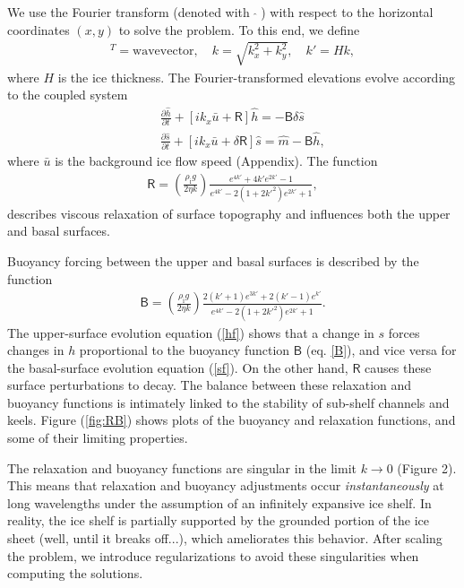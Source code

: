 \documentclass[paper=a4, fontsize=11pt]{article} %
\begin{document}
We use the Fourier transform (denoted with $\;\widehat{}\;$) with respect to the horizontal coordinates $(x,y)$
to solve the problem. To this end, we define
\begin{align*}
[k_x,k_y]^T = \text{wavevector},\quad
k = \sqrt{k_x^2 + k_y^2},\quad
k' = Hk,
\end{align*}
where $H$ is the ice thickness.
The Fourier-transformed elevations evolve according to
the coupled system
\begin{eqnarray}
&&\frac{\partial \widehat{h}}{\partial t}+ \left[ik_x \bar{u}  + \mathsf{R}\right]\widehat{h} = -\mathsf{B}\delta\widehat{s}\label{hf}\\
&&\frac{\partial \widehat{s}}{\partial t}+ [ik_x \bar{u} + \delta\mathsf{R}]\widehat{s} = \widehat{m} - \mathsf{B} \widehat{h}, \label{sf}
\end{eqnarray}
where $\bar{u}$ is the background ice flow speed (Appendix). The function
\begin{eqnarray}
\mathsf{R} = \left(\frac{\rho_\mathrm{i} g}{2\eta k}\right) \frac{e^{4{k'}} +4{k'} e^{2{k'}} -1 }{e^{4{k'}} -2(1+2{k'}^2)e^{2{k'}} +1}, \label{Rf}
\end{eqnarray}
describes viscous relaxation of surface topography and influences both the upper and basal surfaces.

Buoyancy forcing between the upper and basal surfaces is described by the function
\begin{eqnarray}
\mathsf{B} = \left(\frac{\rho_\mathrm{i} g}{2\eta k}\right) \frac{ 2({k'}+1)e^{3{k'}}+2({k'}-1)e^{{k'}} }{e^{4{k'}} -2(1+2{k'}^2)e^{2{k'}} +1}. \label{B}
\end{eqnarray}
The upper-surface evolution equation (\ref{hf}) shows that a change in $s$ forces changes in $h$ proportional to the
buoyancy function $\mathsf{B} $ (eq. \ref{B}), and vice versa for the basal-surface evolution equation (\ref{sf}).
On the other hand, $\mathsf{R}$ causes these surface perturbations to decay. The balance between
these relaxation and buoyancy functions is intimately linked to the stability of sub-shelf channels and keels.
Figure (\ref{fig:RB}) shows plots of the buoyancy and relaxation functions, and some of their
limiting properties.

The relaxation and buoyancy functions are singular in the limit
$k\to 0$ (Figure 2). This means that
relaxation and buoyancy adjustments occur \emph{instantaneously} at long wavelengths under the assumption of
an infinitely expansive ice shelf. In reality, the ice shelf is partially supported by the grounded
portion of the ice sheet (well, until it breaks off...), which ameliorates this behavior.
After scaling the problem, we introduce regularizations to avoid these singularities when computing the solutions.
\end{document}
